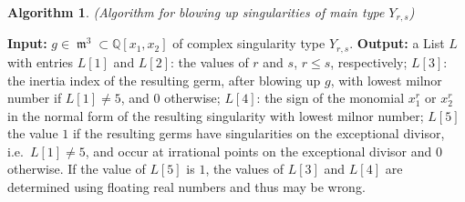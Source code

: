\documentclass[noend]{amsproc}
\DeclareMathOperator{\m}{\mathfrak{m}}
\begin{document}
\newtheorem{BlowUpO}[kjet]{Algorithm}
\begin{BlowUpO}(Algorithm for blowing up singularities of main type $Y_{r,s}$)%
\label{BlowingUp}
\end{BlowUpO}
\noindent\textnormal{\bf Input:} $g\in\m^3\subset\mathbb Q[x_1,x_2]$ of complex
singularity type $Y_{r,s}$.\newline
\textnormal{\bf Output:} a List $L$ with entries $L[1]$ and $L[2]$: the values
of $r$ and $s$, $r\le s$, respectively; $L[3]$: the inertia index of the
resulting germ, after blowing up $g$, with lowest milnor number if $L[1]\neq
5$, and $0$ otherwise; $L[4]$: the sign of the monomial $x_1^r$ or $x_2^r$ in
the normal form of the resulting singularity with lowest milnor number; $L[5]$
the value $1$ if the resulting germs have singularities on the exceptional divisor, i.e.~$L[1]\neq 5$, and occur at irrational points on the exceptional
divisor and $0$ otherwise. If the value of $L[5]$ is $1$, the values of $L[3]$
and $L[4]$ are determined using floating real numbers and thus may be wrong.
\end{document}
